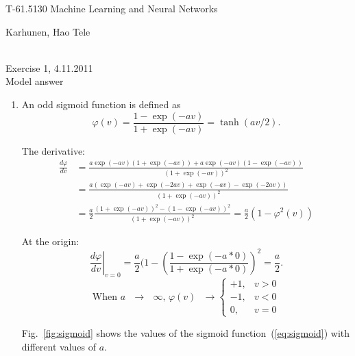 \documentclass[10pt,a4]{article}
\begin{document}
\pagestyle{empty}
\begin{Large}
\begin{bf} 
T-61.5130 Machine Learning and Neural Networks\\ 
\end{bf}
\end{Large}
Karhunen, Hao Tele\\  
\\
\begin{large}
\begin{bf}
Exercise 1,  4.11.2011\\Model answer
\end{bf}
\end{large}

\begin{enumerate}

\item An odd sigmoid function is defined as
\begin{equation} \label{eq:sigmoid}
\varphi(v)=\frac{1-\exp(-av)}{1+\exp(-av)}=\tanh(av/2).
\end{equation}

The derivative:
\begin{equation}
\begin{split}
  \frac{d\varphi}{dv}&=\frac{a\exp(-av) (1 + \exp(-av)) + a\exp(-av)
    (1 - \exp(-av))} {(1+\exp(-av))^2} \\
  &= \frac{a ( \exp(-av) + \exp(-2av) + \exp(-av) - \exp(-2av) )}{(1 +
    \exp(-av))^2} \\
  &= \frac{a}{2} \frac{(1 + \exp(-av))^2 - (1 - \exp(-av))^2}{(1 +
    \exp(-av))^2} = \frac{a}{2} ( 1 - \varphi^2(v) )
\end{split}
\end{equation}

At the origin: 
\begin{equation}
\left.\frac{d\varphi}{dv}\right|_{v=0} = \frac{a}{2} (1 - \left(
  \frac{1 - \exp(-a * 0)}{1 + \exp(-a*0)} \right)^2 = \frac{a}{2}.
\end{equation}
\begin{equation}
  \mbox{When  $a$ $\rightarrow$ $\infty$,  $\varphi(v)$ $\rightarrow$} \left\{ 
    \begin{array}{rl}
      +1, &v > 0 \\
      -1, &v < 0 \\
      0, &v = 0
    \end{array} \right.
  \end{equation}

Fig.~\ref{fig:sigmoid} shows the values of the sigmoid
function~(\ref{eq:sigmoid}) with different values of $a$.


\end{enumerate}
\end{document}
